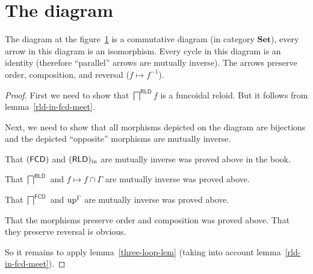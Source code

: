 \section{The diagram}
\begin{thm}
\label{fcd-diagram}The diagram at the figure~\ref{gamma-dia} is
a commutative diagram (in category $\mathbf{Set}$), every arrow in
this diagram is an isomorphism. Every cycle in this diagram is an
identity (therefore ``parallel'' arrows are mutually inverse). The
arrows preserve order, composition, and reversal ($f\mapsto f^{-1}$).

\begin{figure}[ht]
\caption{\label{gamma-dia}}


\end{figure}
\end{thm}
\begin{proof}
First we need to show that $\bigsqcap^{\mathsf{RLD}}f$ is a funcoidal
reloid. But it follows from lemma~\ref{rld-in-fcd-meet}.

Next, we need to show that all morphisms depicted on the diagram are
bijections and the depicted ``opposite'' morphisms are mutually
inverse.

That $(\mathsf{FCD})$ and $(\mathsf{RLD})_{\mathrm{in}}$ are mutually inverse was proved above
in the book.

That $\bigsqcap^{\mathsf{RLD}}$ and $f\mapsto f\cap\Gamma$ are mutually
inverse was proved above.

That $\bigsqcap^{\mathsf{FCD}}$ and $\operatorname{up}^{\Gamma}$ are mutually
inverse was proved above.

That the morphisms preserve order and composition was proved above.
That they preserve reversal is obvious.

So it remains to apply lemma~\ref{three-loop-lem} (taking into account
lemma~\ref{rld-in-fcd-meet}).
\end{proof}

